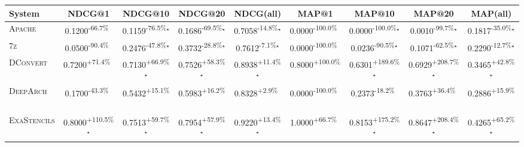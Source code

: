 \begin{table}[htbp]
\centering
\renewcommand{\arraystretch}{1.2}
\begin{tabular}{l|cccc|cccc}
\hline
System & NDCG@1 & NDCG@10 & NDCG@20 & NDCG(all) & MAP@1 & MAP@10 & MAP@20 & MAP(all) \\ \hline
\textsc{Apache} & \cellcolor{red!30}0.1200\textsuperscript{-66.7\%}$^{\,\,\,}$ & \cellcolor{red!30}0.1159\textsuperscript{-76.5\%}$^\star$ & \cellcolor{red!30}0.1686\textsuperscript{-69.5\%}$^\star$ & \cellcolor{red!30}0.7058\textsuperscript{-14.8\%}$^\star$ & \cellcolor{red!30}0.0000\textsuperscript{-100.0\%}$^{\,\,\,}$ & \cellcolor{red!30}0.0000\textsuperscript{-100.0\%}$^\star$ & \cellcolor{red!30}0.0010\textsuperscript{-99.7\%}$^\star$ & \cellcolor{red!30}0.1817\textsuperscript{-35.0\%}$^\star$ \\
\textsc{7z} & \cellcolor{red!30}0.0500\textsuperscript{-90.4\%}$^{\,\,\,}$ & \cellcolor{red!30}0.2476\textsuperscript{-47.8\%}$^\star$ & \cellcolor{red!30}0.3732\textsuperscript{-28.8\%}$^\star$ & \cellcolor{red!30}0.7612\textsuperscript{-7.1\%}$^\star$ & \cellcolor{red!30}0.0000\textsuperscript{-100.0\%}$^{\,\,\,}$ & \cellcolor{red!30}0.0236\textsuperscript{-90.5\%}$^\star$ & \cellcolor{red!30}0.1071\textsuperscript{-62.5\%}$^\star$ & \cellcolor{red!30}0.2290\textsuperscript{-12.7\%}$^\star$ \\
\textsc{DConvert} & \cellcolor{green!30}0.7200\textsuperscript{+71.4\%}$^{\,\,\,}$ & \cellcolor{green!30}0.7130\textsuperscript{+66.9\%}$^\star$ & \cellcolor{green!30}0.7526\textsuperscript{+58.3\%}$^\star$ & \cellcolor{green!30}0.8938\textsuperscript{+11.4\%}$^\star$ & \cellcolor{green!30}0.8000\textsuperscript{+100.0\%}$^{\,\,\,}$ & \cellcolor{green!30}0.6301\textsuperscript{+189.6\%}$^\star$ & \cellcolor{green!30}0.6929\textsuperscript{+208.7\%}$^\star$ & \cellcolor{green!30}0.3465\textsuperscript{+42.8\%}$^\star$ \\
\textsc{DeepArch} & \cellcolor{red!30}0.1700\textsuperscript{-43.3\%}$^{\,\,\,}$ & \cellcolor{green!30}0.5432\textsuperscript{+15.1\%}$^{\,\,\,}$ & \cellcolor{green!30}0.5983\textsuperscript{+16.2\%}$^{\,\,\,}$ & \cellcolor{green!30}0.8328\textsuperscript{+2.9\%}$^{\,\,\,}$ & \cellcolor{red!30}0.0000\textsuperscript{-100.0\%}$^{\,\,\,}$ & \cellcolor{red!30}0.2373\textsuperscript{-18.2\%}$^{\,\,\,}$ & \cellcolor{green!30}0.3763\textsuperscript{+36.4\%}$^{\,\,\,}$ & \cellcolor{green!30}0.2886\textsuperscript{+15.9\%}$^{\,\,\,}$ \\
\textsc{ExaStencils} & \cellcolor{green!30}0.8000\textsuperscript{+110.5\%}$^\star$ & \cellcolor{green!30}0.7513\textsuperscript{+59.7\%}$^\star$ & \cellcolor{green!30}0.7954\textsuperscript{+57.9\%}$^\star$ & \cellcolor{green!30}0.9220\textsuperscript{+13.4\%}$^\star$ & \cellcolor{green!30}1.0000\textsuperscript{+66.7\%}$^{\,\,\,}$ & \cellcolor{green!30}0.8153\textsuperscript{+175.2\%}$^\star$ & \cellcolor{green!30}0.8647\textsuperscript{+208.4\%}$^\star$ & \cellcolor{green!30}0.4265\textsuperscript{+65.2\%}$^\star$ \\

\end{tabular}
\end{table}
